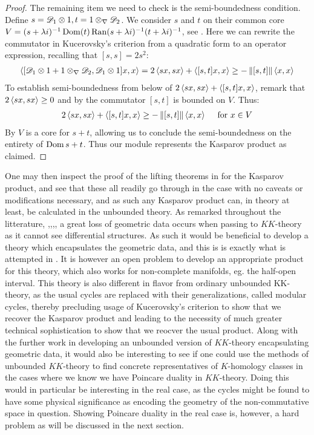 \begin{proof}
	The remaining item we need to check is the semi-boundedness condition. 
	Define $s=\mathscr{D}_1\otimes 1,t=1\otimes_\nabla \mathscr{D}_2$. We consider $s$ and $t$ on their common core $V=(s+\lambda i)^{-1}\operatorname{Dom}(t)\operatorname{Ran}(s+\lambda i)^{-1}(t+\lambda i)^{-1}$, see . Here we can rewrite the commutator in Kucerovsky's criterion from a quadratic form to an operator expression, recalling that $[s,s]=2s^2$:
	\begin{align*}
		\left \langle [ \mathscr{D}_1\otimes 1+ 1\otimes_\nabla \mathscr{D}_2,\mathscr{D}_1\otimes 1]x,x \right \rangle=2\left \langle sx,sx \right \rangle+\left \langle [s,t]x,x \right \rangle\geq -\left \Vert [s,t] \right \Vert\left \langle x,x \right \rangle
	\end{align*}
	To establish semi-boundedness from below of $2\left \langle sx,sx \right \rangle+\left \langle [s,t]x,x \right \rangle$, remark that $2\left \langle sx,sx \right \rangle\geq 0$ and by  the commutator $[s,t]$ is bounded on $V$. Thus:
	\begin{align*}
		2\left \langle sx,sx \right \rangle+\left \langle [s,t]x,x \right \rangle\geq -\left \Vert [s,t] \right \Vert\left \langle x,x \right \rangle \quad \text{ for } x \in V
	\end{align*}
	By  $V$ is a core for $s+t$, allowing us to conclude the semi-boundedness on the entirety of $\operatorname{Dom} s+t$. 
	Thus our module represents the Kasparov product as claimed.
\end{proof}
One may then inspect the proof of the lifting theorems in \cite{mesrennie} for the Kasparov product, and see that these all readily go through in the case with no caveats or modifications necessary, and as such any Kasparov product can, in theory at least, be calculated in the unbounded theory. As remarked throughout the litterature, \cite{mesland},\cite{kaad},\cite{jensmorita},\cite{suijlekom}, a great loss of geometric data occurs when passing to $KK$-theory as it cannot see differential structures. 
As such it would be beneficial to develop a theory which encapsulates the geometric data, and this is is exactly what is attempted in \cite{jensmorita}. It is however an open problem to develop an appropriate product for this theory, which also works for non-complete manifolds, eg. the half-open interval. This theory is also different in flavor from ordinary unbounded KK-theory, as the usual cycles are replaced with their generalizations, called modular cycles, thereby precluding usage of Kucerovsky's criterion to show that we recover the Kasparov product and leading to the necessity of much greater technical sophistication to show that we reocver the usual product. 
Along with the further work in developing an unbounded version of $KK$-theory encapsulating geometric data, it would also be interesting to see if one could use the methods of unbounded $KK$-theory to find concrete representatives of $K$-homology classes in the cases where we know we have Poincare duality in $KK$-theory. Doing this would in particular be interesting in the real case, as the cycles might be found to have some physical significance as encoding the geometry of the non-commutative space in question. Showing Poincare duality in the real case is, however, a hard problem as will be discussed in the next section. 